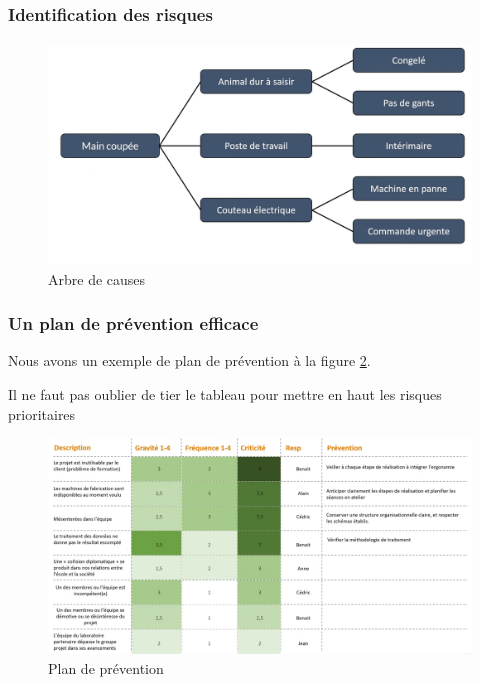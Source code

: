 \subsubsection{Identification des risques}
\begin{figure}[!h]
	\begin{center}
		\includegraphics[scale=0.25]{images/arbre_causes.png}
		\caption{Arbre de causes}
		\label{fig:arbre_causes}
	\end{center}
\end{figure}
\subsubsection{Un plan de prévention efficace}
Nous avons un exemple de plan de prévention à la figure \ref{fig:plan_prevention}.
\begin{danger}
	Il ne faut pas oublier de tier le tableau pour mettre en haut les risques prioritaires
\end{danger}
\begin{figure}[!h]
	\begin{center}
		\includegraphics[scale=0.25]{images/plan_prevention.png}
		\caption{Plan de prévention}
		\label{fig:plan_prevention}
	\end{center}
\end{figure}
\clearpage
